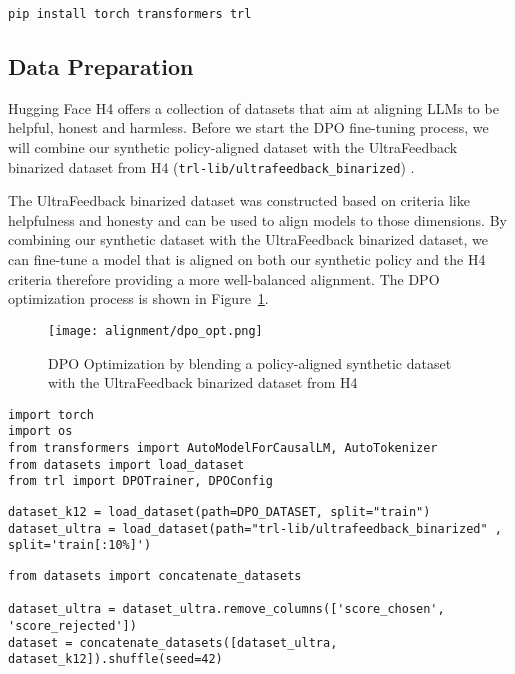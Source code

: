 \begin{verbatim}
pip install torch transformers trl
\end{verbatim}

\subsection{Data Preparation}
Hugging Face H4  offers a collection of datasets that aim at aligning LLMs to be helpful, honest and harmless. Before we start the DPO fine-tuning process, we will combine our synthetic policy-aligned dataset with the UltraFeedback binarized dataset from H4 (\texttt{trl-lib/ultrafeedback\_binarized}) .

The UltraFeedback binarized dataset was constructed based on criteria like helpfulness and honesty and can be used to align models to those dimensions. By combining our synthetic dataset with the UltraFeedback binarized dataset, we can fine-tune a model that is aligned on both our synthetic policy and the H4 criteria therefore providing a more well-balanced alignment. The DPO optimization process is shown in Figure~\ref{fig:dpo-optimization}.

\begin{figure}[H]
\centering
\texttt{[image: alignment/dpo\_opt.png]}
\caption{DPO Optimization by blending a policy-aligned synthetic dataset with the UltraFeedback binarized dataset from H4}
\label{fig:dpo-optimization}
\end{figure}

\begin{verbatim}
import torch
import os
from transformers import AutoModelForCausalLM, AutoTokenizer
from datasets import load_dataset
from trl import DPOTrainer, DPOConfig
\end{verbatim}

\begin{verbatim}
dataset_k12 = load_dataset(path=DPO_DATASET, split="train")
dataset_ultra = load_dataset(path="trl-lib/ultrafeedback_binarized" , split='train[:10%]')
\end{verbatim}

\begin{verbatim}
from datasets import concatenate_datasets

dataset_ultra = dataset_ultra.remove_columns(['score_chosen', 'score_rejected'])
dataset = concatenate_datasets([dataset_ultra, dataset_k12]).shuffle(seed=42)
\end{verbatim}

